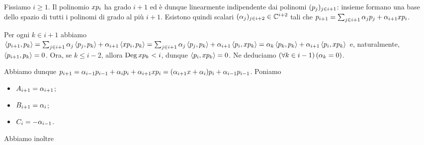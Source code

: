 \Proof Fissiamo $i \geq 1$. Il polinomio $x p_i$ ha grado $i + 1$ ed \`e dunque linearmente indipendente dai polinomi $(p_j)_{j \in i + 1}$: insieme formano una base dello spazio di tutti i polinomi di grado al pi\`u $i + 1$. Esistono quindi scalari $(\alpha_j)_{j \in i + 2} \in \mathbb{C}^{i + 2}$ tali che $p_{i + 1} = \sum_{j \in i + 1} \alpha_j p_j + \alpha_{i + 1} x p_i$.
\par Per ogni $k \in i + 1$ abbiamo $\left \langle p_{i + 1} , p_k \right \rangle =
\sum_{j \in i + 1} \alpha_j \left \langle p_j , p_k \right \rangle + \alpha_{i + 1} \left \langle x p_i , p_k \right \rangle =
\sum_{j \in i + 1} \alpha_j \left \langle p_j , p_k \right \rangle + \alpha_{i + 1} \left \langle p_i , x p_k \right \rangle = \alpha_k \left \langle p_k , p_k \right \rangle + \alpha_{i + 1} \left \langle p_i , xp_k \right \rangle$
e, naturalmente, $\left \langle p_{i + 1} , p_k \right \rangle = 0$.
Ora, se $k \leq i - 2$, allora $\operatorname{\operatorname{Deg}}{x p_k} < i$, dunque $\left \langle p_i , x p_k \right \rangle = 0$. Ne deduciamo $\left ( \forall k \in i - 1 \right ) \left ( \alpha_k = 0 \right )$.
\par Abbiamo dunque $p_{i + 1} = \alpha_{i - 1} p_{i - 1} + \alpha_i p_i + \alpha_{i + 1} x p_i = 
(\alpha_{i + 1} x + \alpha_i) p_i + \alpha_{i - 1} p_{i - 1}$. Poniamo
\begin{itemize}
	\item $A_{i + 1} = \alpha_{i + 1}$;
	\item $B_{i + 1} = \alpha_i$;
	\item $C_i = - \alpha_{i - 1}$.
\end{itemize}
\par Abbiamo inoltre

